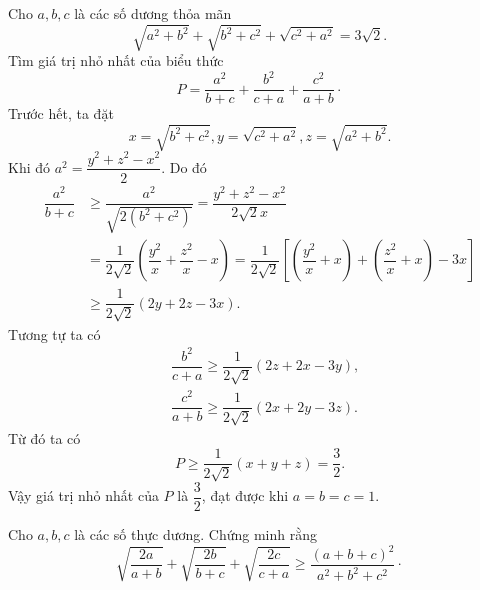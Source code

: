 \begin{bt} %
	Cho $a,b,c$ là các số dương thỏa mãn $$\sqrt{a^2+b^2}+\sqrt{b^2+c^2}+\sqrt{c^2+a^2}=3\sqrt{2}.$$
	Tìm giá trị nhỏ nhất của biểu thức $$P=\dfrac{a^2}{b+c}+\dfrac{b^2}{c+a}+\dfrac{c^2}{a+b}\cdot$$
	\loigiai
	{
		Trước hết, ta đặt $$x=\sqrt{b^2+c^2}, y=\sqrt{c^2+a^2}, z=\sqrt{a^2+b^2}.$$
		Khi đó $a^2=\dfrac{y^2+z^2-x^2}{2}$. Do đó 
		$$\begin{aligned}
		\dfrac{a^2}{b+c}&\ge \dfrac{a^2}{\sqrt{2(b^2+c^2)}}=\dfrac{y^2+z^2-x^2}{2\sqrt{2}x}\\ 
		&=\dfrac{1}{2\sqrt{2}}\left(\dfrac{y^2}{x}+\dfrac{z^2}{x}-x\right)=\dfrac{1}{2\sqrt{2}}\left[\left(\dfrac{y^2}{x}+x\right)+\left(\dfrac{z^2}{x}+x\right)-3x\right]\\
		&\ge \dfrac{1}{2\sqrt{2}}\left(2y+2z-3x\right).
		\end{aligned}$$
		Tương tự ta có $$\begin{aligned}
		&\dfrac{b^2}{c+a}\ge \dfrac{1}{2\sqrt{2}}\left(2z+2x-3y\right),\\ 
		&\dfrac{c^2}{a+b}\ge  \dfrac{1}{2\sqrt{2}}\left(2x+2y-3z\right).
		\end{aligned}$$
		Từ đó ta có $$P\ge \dfrac{1}{2\sqrt{2}}(x+y+z)=\dfrac{3}{2}.$$
		Vậy giá trị nhỏ nhất của $P$ là $\dfrac{3}{2}$, đạt được khi $a=b=c=1.$
	}
\end{bt}
\begin{bt} %
	Cho $a,b,c$ là các số thực dương. Chứng minh rằng $$\sqrt{\dfrac{2a}{a+b}}+\sqrt{\dfrac{2b}{b+c}}+\sqrt{\dfrac{2c}{c+a}}\ge \dfrac{(a+b+c)^2}{a^2+b^2+c^2}\cdot$$
\end{bt}

